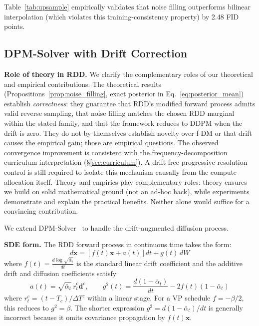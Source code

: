 \documentclass[10pt]{article}
\newcommand{\bx}{\bm{x}}
\newcommand{\bd}{\bm{d}}
\begin{document}
Table~\ref{tab:upsample} empirically validates that noise filling outperforms bilinear interpolation (which violates this training-consistency property) by 2.48 FID points.

\subsection{DPM-Solver with Drift Correction}
\label{sec:dpmsolver}


\textbf{Role of theory in RDD.}
We clarify the complementary roles of our theoretical and empirical contributions.
The theoretical results (Propositions~\ref{prop:noise_filling}, exact posterior in Eq.~\ref{eq:posterior_mean}) establish \emph{correctness}: they guarantee that RDD's modified forward process admits valid reverse sampling, that noise filling matches the chosen RDD marginal within the stated family, and that the framework reduces to DDPM when the drift is zero. They do not by themselves establish novelty over f-DM or that drift causes the empirical gain; those are empirical questions.
The observed convergence improvement is consistent with the frequency-decomposition curriculum interpretation (\S\ref{sec:curriculum}).
A drift-free progressive-resolution control is still required to isolate this mechanism causally from the compute allocation itself.
Theory and empirics play complementary roles: theory ensures we build on solid mathematical ground (not an ad-hoc hack), while experiments demonstrate and explain the practical benefits.
Neither alone would suffice for a convincing contribution.

We extend DPM-Solver~\citep{lu2022dpm} to handle the drift-augmented diffusion process.

\textbf{SDE form.} The RDD forward process in continuous time takes the form:
\begin{equation}
    d\bx = \left[f(t)\bx + a(t)\right]dt + g(t)\,dW
    \label{eq:sde}
\end{equation}
where $f(t) = \frac{d\log\sqrt{\bar\alpha_t}}{dt}$ is the standard linear drift coefficient and the additive drift and diffusion coefficients satisfy
\begin{equation}
    a(t) = \sqrt{\bar\alpha_t}\,\dot r_t^c\bd^c,
    \qquad
    g^2(t)=\frac{d(1-\bar\alpha_t)}{dt}-2f(t)(1-\bar\alpha_t)
\end{equation}
where $r_t^c=(t-T_c)/\Delta T^c$ within a linear stage. For a VP schedule $f=-\beta/2$, this reduces to $g^2=\beta$. The shorter expression $g^2=d(1-\bar\alpha_t)/dt$ is generally incorrect because it omits covariance propagation by $f(t)\bx$.
\end{document}
